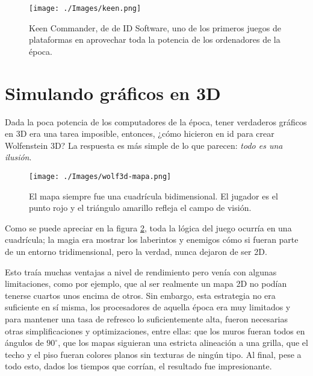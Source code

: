 \begin{figure}[h!]
	\centering
	\texttt{[image: ./Images/keen.png]}
	\caption{Keen Commander, de de ID Software, uno de los primeros juegos de plataformas en aprovechar toda la potencia de los ordenadores de la época.}
	\label{keen}
\end{figure}
 



\newpage

\section{Simulando gráficos en 3D}


Dada la poca potencia de los computadores de la época, tener verdaderos gráficos en 3D era una tarea imposible, entonces, ¿cómo hicieron en id para crear Wolfenstein 3D? La respuesta es más simple de lo que parecen: \emph{todo es una ilusión}.

\begin{figure}[h!]
	\centering
	\texttt{[image: ./Images/wolf3d-mapa.png]}
	\caption{El mapa siempre fue una cuadrícula bidimensional. El jugador es el punto rojo y el triángulo amarillo refleja el campo de visión.}
	\label{wolf3d-mapa}
\end{figure}

Como se puede apreciar en la figura \ref{wolf3d-mapa}, toda la lógica del juego ocurría en una cuadrícula; la magia era mostrar los laberintos y enemigos cómo si fueran parte de un entorno tridimensional, pero la verdad, nunca dejaron de ser 2D.

Esto traía muchas ventajas a nivel de rendimiento pero venía con algunas limitaciones, como por ejemplo, que al ser realmente un mapa 2D no podían tenerse cuartos unos encima de otros. Sin embargo, esta estrategia no era suficiente en sí misma, los procesadores de aquella época era muy limitados y para mantener una tasa de refresco lo suficientemente alta, fueron necesarias otras simplificaciones y optimizaciones, entre ellas: que los muros fueran todos en ángulos de $90^{\circ}$, que los mapas siguieran una estricta alineación a una grilla, que el techo y el piso fueran colores planos sin texturas de ningún tipo. Al final, pese a todo esto, dados los tiempos que corrían, el resultado fue impresionante. 

